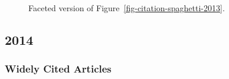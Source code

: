 \documentclass[
  10pt,
  letterpaper,
  DIV=11,
  numbers=noendperiod,
  twoside]{scrartcl}
\begin{document}
\begin{figure}


\caption{\label{fig-citation-facet-2013}Faceted version of
Figure~\ref{fig-citation-spaghetti-2013}.}

\end{figure}%

\newpage

\subsection{2014}\label{sec-s2014}

\subsubsection*{Widely Cited Articles}\label{widely-cited-articles-58}
\end{document}
